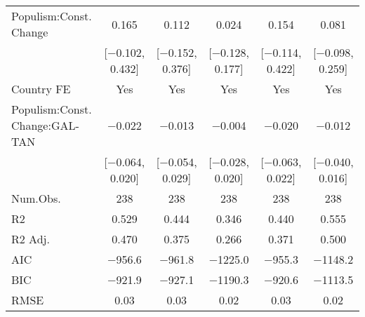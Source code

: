 \begin{table}
\begin{tabular}[t]{lccccc}
Populism:Const. Change & \num{0.165} & \num{0.112} & \num{0.024} & \num{0.154} & \num{0.081}\\
 & {}[\num{-0.102}, \num{0.432}] & {}[\num{-0.152}, \num{0.376}] & {}[\num{-0.128}, \num{0.177}] & {}[\num{-0.114}, \num{0.422}] & {}[\num{-0.098}, \num{0.259}]\\
Country FE & Yes & Yes & Yes & Yes & Yes\\
Populism:Const. Change:GAL-TAN & \num{-0.022} & \num{-0.013} & \num{-0.004} & \num{-0.020} & \num{-0.012}\\
 & {}[\num{-0.064}, \num{0.020}] & {}[\num{-0.054}, \num{0.029}] & {}[\num{-0.028}, \num{0.020}] & {}[\num{-0.063}, \num{0.022}] & {}[\num{-0.040}, \num{0.016}]\\
\midrule
Num.Obs. & \num{238} & \num{238} & \num{238} & \num{238} & \num{238}\\
R2 & \num{0.529} & \num{0.444} & \num{0.346} & \num{0.440} & \num{0.555}\\
R2 Adj. & \num{0.470} & \num{0.375} & \num{0.266} & \num{0.371} & \num{0.500}\\
AIC & \num{-956.6} & \num{-961.8} & \num{-1225.0} & \num{-955.3} & \num{-1148.2}\\
BIC & \num{-921.9} & \num{-927.1} & \num{-1190.3} & \num{-920.6} & \num{-1113.5}\\
RMSE & \num{0.03} & \num{0.03} & \num{0.02} & \num{0.03} & \num{0.02}\\
\bottomrule
\end{tabular}
\end{table}
